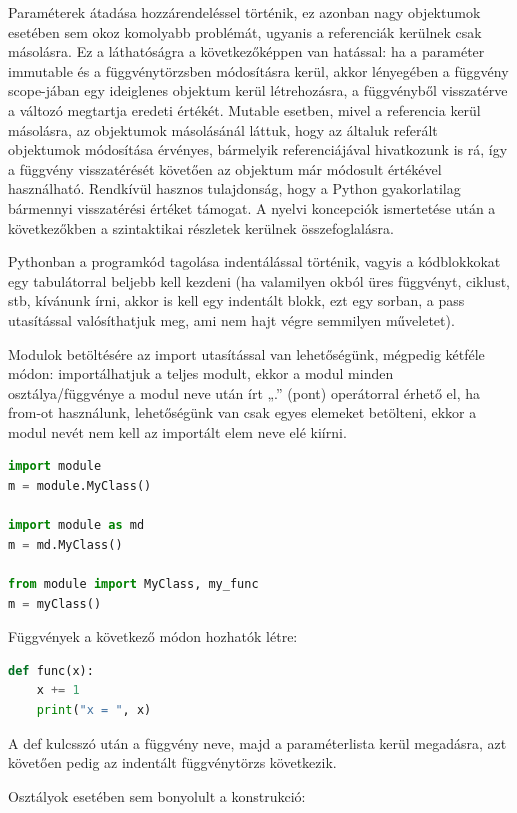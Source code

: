 \documentclass[12pt,a4paper,oneside]{report}             %
\begin{document}
Paraméterek átadása hozzárendeléssel történik, ez azonban nagy objektumok esetében sem okoz komolyabb problémát, ugyanis a referenciák kerülnek csak másolásra. Ez a láthatóságra a következőképpen van hatással: ha a paraméter immutable és a függvénytörzsben módosításra kerül, akkor lényegében a függvény scope-jában egy ideiglenes objektum kerül létrehozásra, a függvényből visszatérve a változó megtartja eredeti értékét. Mutable esetben, mivel a referencia kerül másolásra, az objektumok másolásánál láttuk, hogy az általuk referált objektumok módosítása érvényes, bármelyik referenciájával hivatkozunk is rá, így a függvény visszatérését követően az objektum már módosult értékével használható.
Rendkívül hasznos tulajdonság, hogy a Python gyakorlatilag bármennyi visszatérési értéket támogat.
A nyelvi koncepciók ismertetése után a következőkben a szintaktikai részletek kerülnek összefoglalásra.

Pythonban a programkód tagolása indentálással történik, vagyis a kódblokkokat egy tabulátorral beljebb kell kezdeni (ha valamilyen okból üres függvényt, ciklust, stb, kívánunk írni, akkor is kell egy indentált blokk, ezt egy sorban, a pass utasítással valósíthatjuk meg, ami nem hajt végre semmilyen műveletet).

Modulok betöltésére az import utasítással van lehetőségünk, mégpedig kétféle módon: importálhatjuk a teljes modult, ekkor a modul minden osztálya/függvénye a modul neve után írt „.” (pont) operátorral érhető el, ha from-ot használunk, lehetőségünk van csak egyes elemeket betölteni, ekkor a modul nevét nem kell az importált elem neve elé kiírni.

\begin{lstlisting}[language=Python]
import module
m = module.MyClass()

import module as md
m = md.MyClass()

from module import MyClass, my_func
m = myClass()
\end{lstlisting}

Függvények a következő módon hozhatók létre:

\begin{lstlisting}[language=Python]
def func(x):
	x += 1
	print("x = ", x)
\end{lstlisting}

A def kulcsszó után a függvény neve, majd a paraméterlista kerül megadásra, azt követően pedig az indentált függvénytörzs következik.

Osztályok esetében sem bonyolult a konstrukció:
\end{document}
